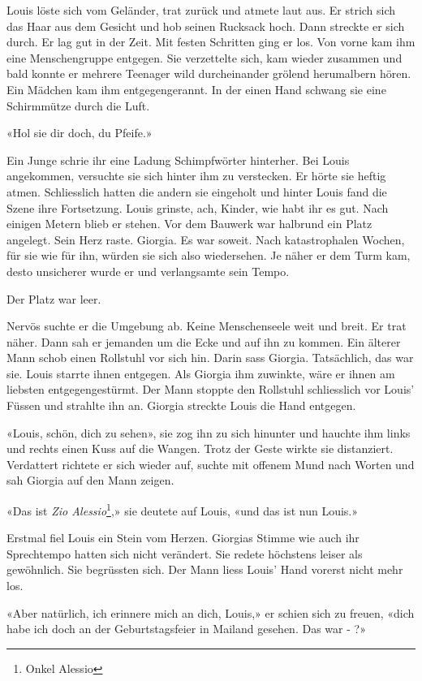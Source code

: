 Louis löste sich vom Geländer, trat zurück und atmete laut aus. Er strich sich das
Haar aus dem Gesicht und hob seinen Rucksack hoch. Dann streckte er sich
durch.
Er lag gut in der Zeit.
Mit festen Schritten ging er los. Von vorne kam ihm eine Menschengruppe
entgegen. Sie verzettelte sich, kam wieder zusammen und bald konnte er
mehrere Teenager wild durcheinander grölend herumalbern hören. Ein
Mädchen kam ihm entgegengerannt. In der einen Hand schwang sie eine
Schirmmütze durch die Luft.

«Hol sie dir doch, du Pfeife.»

Ein Junge schrie ihr eine Ladung Schimpfwörter hinterher. Bei Louis 
angekommen, versuchte sie sich hinter ihm zu verstecken. Er hörte
sie heftig atmen. Schliesslich hatten die andern sie eingeholt und
hinter Louis fand die Szene ihre Fortsetzung.
Louis grinste, ach, Kinder, wie habt ihr es gut.
Nach einigen Metern blieb er stehen. Vor dem Bauwerk war halbrund ein
Platz angelegt. Sein Herz raste. Giorgia. Es war soweit. Nach katastrophalen Wochen, 
für sie wie für ihn, würden sie sich also wiedersehen.
Je näher er dem Turm kam, desto unsicherer wurde er und verlangsamte
sein Tempo.

Der Platz war leer.

Nervös suchte er die Umgebung ab. Keine Menschenseele weit und breit. Er
trat näher. Dann sah er jemanden um die Ecke und auf ihn zu kommen. Ein
älterer Mann schob einen Rollstuhl vor sich hin. Darin sass Giorgia.
Tatsächlich, das war sie.
Louis starrte ihnen entgegen. Als Giorgia ihm zuwinkte, wäre er ihnen am liebsten entgegengestürmt. 
Der Mann stoppte den Rollstuhl schliesslich vor Louis’ Füssen und strahlte ihn an.
Giorgia streckte Louis die Hand entgegen.

«Louis, schön, dich zu sehen», sie zog ihn zu sich hinunter und hauchte ihm links und 
rechts einen Kuss auf die Wangen. Trotz der Geste wirkte sie distanziert. Verdattert richtete er sich wieder auf, suchte mit offenem Mund nach Worten und sah Giorgia auf den Mann zeigen. 

«Das ist \emph{Zio Alessio}\footnote{Onkel Alessio},» sie deutete auf Louis, «und das ist nun
Louis.»

Erstmal fiel Louis ein Stein vom Herzen. Giorgias Stimme wie auch ihr
Sprechtempo hatten sich nicht verändert. Sie redete höchstens leiser als
gewöhnlich.
Sie begrüssten sich. Der Mann liess Louis’ Hand vorerst nicht mehr los.

«Aber natürlich, ich erinnere mich an dich, Louis,» er schien sich zu
freuen, «dich habe ich doch an der Geburtstagsfeier in Mailand gesehen.
Das war - ?»

